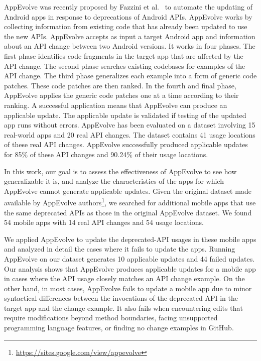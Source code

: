 AppEvolve was recently proposed by Fazzini et al.~\cite{fazzini2019automated} to
automate the updating of Android apps in response to deprecations of
Android APIs.  AppEvolve works by collecting information from existing code
that has already been updated to use the new APIs. 
AppEvolve accepts as input a target Android app and information about an API change between two Android versions. It works in four phases. The first phase identifies code fragments in the target app that are affected by the API change. The second phase searches existing codebases for examples of the API change. The third phase generalizes each example into a form of generic code patches. These code patches are then ranked. In the fourth and final phase, AppEvolve applies the generic code patches one at a time according to their ranking. A successful application means that AppEvolve can produce an applicable update. The applicable update is validated if testing of the updated app runs without errors. AppEvolve has been evaluated on a dataset involving 15 real-world apps and 20 real API changes. The dataset contains 41 usage locations of these real API changes. AppEvolve successfully produced applicable updates for 85\% of these API changes and 90.24\% of their usage locations. 

In this work, our goal is to assess the effectiveness of AppEvolve to see how generalizable it is, and
analyze the characteristics of the apps for which AppEvolve cannot generate applicable updates.
Given the original dataset made available by AppEvolve authors\footnote{\url{https://sites.google.com/view/appevolve}}, we searched for additional mobile apps that use the same deprecated APIs as those in the original AppEvolve dataset. We found 54 mobile apps with 14 real API changes and 54 usage locations. 

We applied AppEvolve to update the deprecated-API usages in these mobile apps and analyzed in detail the cases where it fails to update the apps. Running AppEvolve on our dataset generates 10 applicable updates and 44 failed updates. Our analysis shows that AppEvolve produces applicable updates for a mobile app in cases where the API usage closely matches an API change example.  On the other hand, in most cases, AppEvolve fails to update a mobile app due to minor syntactical differences between the invocations of the deprecated API in the target app and the change example.
It also fails when encountering edits that require modifications beyond method boundaries, facing unsupported programming language features, or finding no change examples in GitHub.

